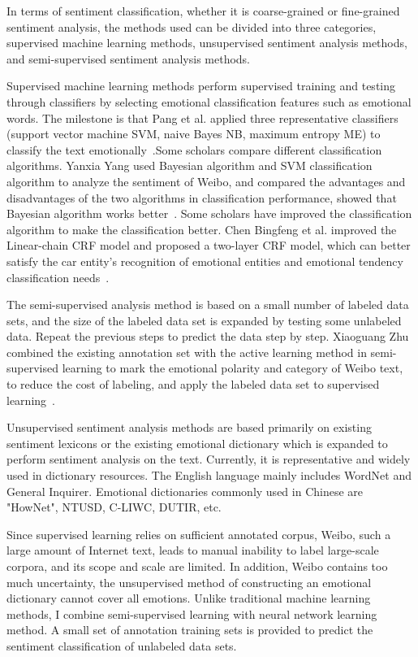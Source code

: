 \documentclass[runningheads, twocolumn]{llncs}
\begin{document}
In terms of sentiment classification, whether it is coarse-grained or fine-grained sentiment analysis, the methods used can be divided into three categories, supervised machine learning methods, unsupervised sentiment analysis methods, and semi-supervised sentiment analysis methods.

Supervised machine learning methods perform supervised training and testing through classifiers by selecting emotional classification features such as emotional words. The milestone is that Pang et al. applied three representative classifiers (support vector machine SVM, naive Bayes NB, maximum entropy ME) to classify the text emotionally~\cite{DBLP:conf/emnlp/PangLV02}.Some scholars compare different classification algorithms. Yanxia Yang used Bayesian algorithm and SVM classification algorithm to analyze the sentiment of Weibo, and compared the advantages and disadvantages of the two algorithms in classification performance, showed that Bayesian algorithm works better~\cite{yang2015microblog}. Some scholars have improved the classification algorithm to make the classification better. Chen Bingfeng et al. improved the Linear-chain CRF model and proposed a two-layer CRF model, which can better satisfy the car entity's recognition of emotional entities and emotional tendency classification needs~\cite{Chen2017A}.

The semi-supervised analysis method is based on a small number of labeled data sets, and the size of the labeled data set is expanded by testing some unlabeled data. Repeat the previous steps to predict the data step by step. Xiaoguang Zhu combined the existing annotation set with the active learning method in semi-supervised learning to mark the emotional polarity and category of Weibo text, to reduce the cost of labeling, and apply the labeled data set to supervised learning~\cite{zhu2013chinese}.

Unsupervised sentiment analysis methods are based primarily on existing sentiment lexicons or the existing emotional dictionary which is expanded to perform sentiment analysis on the text. Currently, it is representative and widely used in dictionary resources. The English language mainly includes WordNet and General Inquirer. Emotional dictionaries commonly used in Chinese are "HowNet", NTUSD, C-LIWC, DUTIR, etc.

Since supervised learning relies on sufficient annotated corpus, Weibo, such a large amount of Internet text, leads to manual inability to label large-scale corpora, and its scope and scale are limited. In addition, Weibo contains too much uncertainty, the unsupervised method of constructing an emotional dictionary cannot cover all emotions.  Unlike traditional machine learning methods, I combine semi-supervised learning with neural network learning method. A small set of annotation training sets is provided to predict the sentiment classification of unlabeled data sets.
\end{document}
